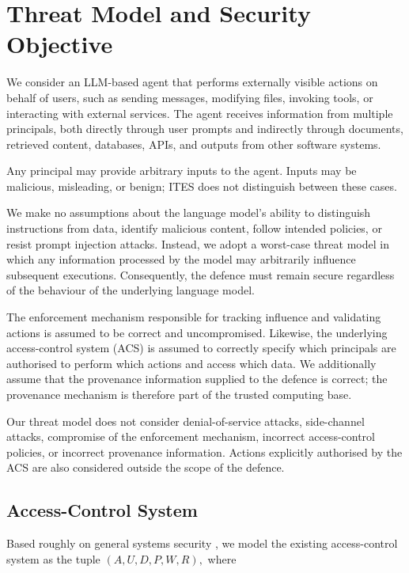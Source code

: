\documentclass{article} %
\begin{document}
\section{Threat Model and Security Objective}

We consider an LLM-based agent that performs externally visible actions on behalf of users, such as sending messages, modifying files, invoking tools, or interacting with external services. The agent receives information from multiple principals, both directly through user prompts and indirectly through documents, retrieved content, databases, APIs, and outputs from other software systems.

Any principal may provide arbitrary inputs to the agent. Inputs may be malicious, misleading, or benign; ITES does not distinguish between these cases.

We make no assumptions about the language model's ability to distinguish instructions from data, identify malicious content, follow intended policies, or resist prompt injection attacks. Instead, we adopt a worst-case threat model in which any information processed by the model may arbitrarily influence subsequent executions. Consequently, the defence must remain secure regardless of the behaviour of the underlying language model.

The enforcement mechanism responsible for tracking influence and validating actions is assumed to be correct and uncompromised. Likewise, the underlying access-control system (ACS) is assumed to correctly specify which principals are authorised to perform which actions and access which data. We additionally assume that the provenance information supplied to the defence is correct; the provenance mechanism is therefore part of the trusted computing base.

Our threat model does not consider denial-of-service attacks, side-channel attacks, compromise of the enforcement mechanism, incorrect access-control policies, or incorrect provenance information. Actions explicitly authorised by the ACS are also considered outside the scope of the defence.

\subsection{Access-Control System}

Based roughly on general systems security \cite{10.1145/3007204}, we model the existing access-control system as the tuple
\(
(A,U,D,P,W,R),
\)
where
\end{document}
